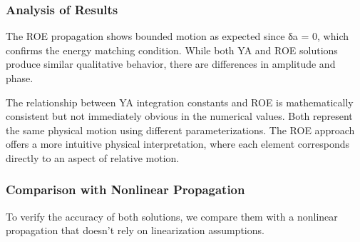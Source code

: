 \subsubsection{Analysis of Results}
The ROE propagation shows bounded motion as expected since δa = 0, which confirms the energy matching condition. While both YA and ROE solutions produce similar qualitative behavior, there are differences in amplitude and phase. 

The relationship between YA integration constants and ROE is mathematically consistent but not immediately obvious in the numerical values. Both represent the same physical motion using different parameterizations. The ROE approach offers a more intuitive physical interpretation, where each element corresponds directly to an aspect of relative motion.

\subsubsection{Comparison with Nonlinear Propagation}
To verify the accuracy of both solutions, we compare them with a nonlinear propagation that doesn't rely on linearization assumptions.





